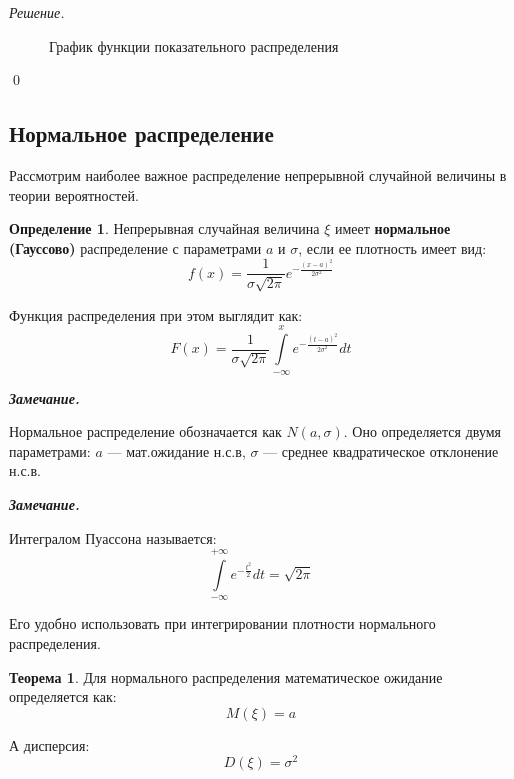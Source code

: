 \documentclass[12pt,a4paper]{article}
\theoremstyle{definition}
\newtheorem{definition}{Определение}[section]
\theoremstyle{definition}
\newtheorem{theorem}{Теорема}[section]
\theoremstyle{remark}
\newenvironment{remark}{
  \par\noindent\textbf{\textit{Замечание.}}~
}{\par}
\theoremstyle{corollary}
\theoremstyle{bolditalic}
\newenvironment{solution}{
    \vspace{0.5em}
    \noindent\textit{Решение.}
}{\qed\vspace{1em}}
\begin{document}
\begin{solution}
\begin{figure}[h!]
\centering
{}
\caption{График функции показательного распределения}
\end{figure}
\end{solution}


\subsection{Нормальное распределение}

Рассмотрим наиболее важное распределение непрерывной случайной величины в теории вероятностей.

\begin{definition}
    Непрерывная случайная величина $\xi$ имеет \textbf{нормальное (Гауссово)} распределение с параметрами $a$ и $\sigma$, если ее плотность имеет вид:
    \[
    f(x) = \frac{1}{\sigma\sqrt{2\pi}} e^{-\frac{(x-a)^2}{2\sigma^2}}
    \]

    Функция распределения при этом выглядит как:
    \[
    F(x) = \frac{1}{\sigma\sqrt{2\pi}} \int\limits_{-\infty}^{x} e^{-\frac{(t-a)^2}{2\sigma^2}} dt
    \]
\end{definition}

\begin{remark}
    Нормальное распределение обозначается как $N(a,\sigma)$. Оно определяется двумя параметрами: $a$ --- мат.ожидание н.с.в, $\sigma$ --- среднее квадратическое отклонение н.с.в.
\end{remark}

\begin{remark}
    Интегралом Пуассона называется:
    \[
    \int\limits_{-\infty}^{+\infty}{e^{-\frac{t^2}{2}}dt}=\sqrt{2\pi}
    \]

    Его удобно использовать при интегрировании плотности нормального распределения.
\end{remark}

\begin{theorem}
    Для нормального распределения математическое ожидание определяется как:
    \[
    M(\xi) = a
    \]
    
    А дисперсия:
    \[
    D(\xi) = \sigma^2
    \]\\
    
\end{theorem}
\end{document}
